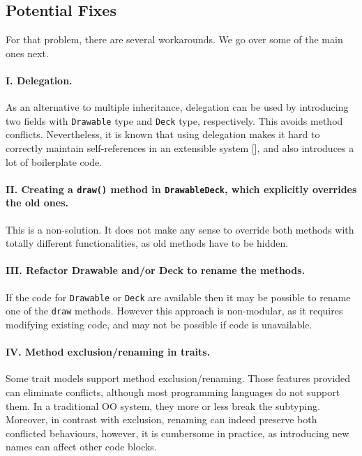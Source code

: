 \subsection{Potential Fixes}

For that problem, there are several workarounds. We go over some of
the main ones next.

\paragraph{I. Delegation.} As an alternative to multiple inheritance,
delegation can be used by introducing two fields with
\lstinline|Drawable| type and \lstinline|Deck| type,
respectively. This avoids method conflicts. Nevertheless, it is known
that using delegation makes it hard to correctly maintain
self-references  in an extensible system [], and also
introduces a lot of boilerplate code.

\paragraph{II. Creating a \lstinline|draw()| method in \lstinline|DrawableDeck|, which explicitly overrides the old ones.}
This is a non-solution. It does not make any sense to override both methods with totally different functionalities, as old
methods have to be hidden.

\paragraph{III. Refactor Drawable and/or Deck to rename the methods.} If
the code for \lstinline|Drawable| or \lstinline|Deck| are available
then it may be possible to rename one of the \lstinline|draw|
methods. However this approach is non-modular, as it requires 
modifying existing code, and may not be possible if code is unavailable.


\paragraph{IV. Method exclusion/renaming in traits.} Some trait models
support method exclusion/renaming. Those features
provided can eliminate conflicts, although most
programming languages do not support them. In a traditional OO system,
they more or less break the subtyping. Moreover, in
contrast with exclusion, renaming can indeed preserve both conflicted
behaviours, however, it is cumbersome in practice, as introducing new
names can affect other code blocks.

